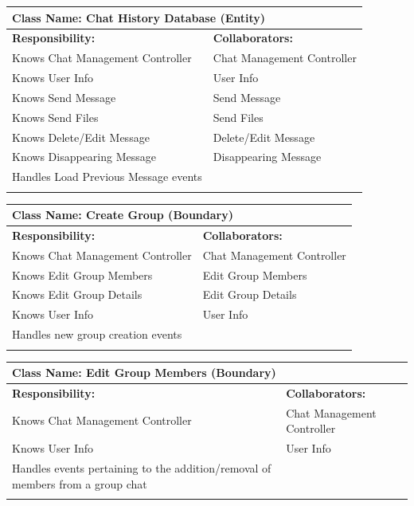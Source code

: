 \documentclass[]{article}
\begin{document}
\begin{itemize}
	\begin{table}[ht]
		\centering
		\begin{tabular}{|p{7cm}|p{7cm}|}
		\hline 
		\multicolumn{2}{|l|}{\textbf{Class Name:} Chat History Database (Entity)} \\
		\hline
		\textbf{Responsibility:} & \textbf{Collaborators:} \\
		\hline
  			Knows Chat Management Controller & Chat Management Controller \\
     			Knows User Info & User Info \\
			Knows Send Message & Send Message \\
			Knows Send Files & Send Files \\
			Knows Delete/Edit Message & Delete/Edit Message\\
			Knows Disappearing Message & Disappearing Message \\
			Handles Load Previous Message events & \\
		\vspace{1in} & \\
		\hline
		\end{tabular}
	\end{table}

  	\begin{table}[ht]
		\centering
		\begin{tabular}{|p{7cm}|p{7cm}|}
		\hline 
		\multicolumn{2}{|l|}{\textbf{Class Name:} Create Group (Boundary)} \\
		\hline
		\textbf{Responsibility:} & \textbf{Collaborators:} \\
		\hline
  			Knows Chat Management Controller & Chat Management Controller \\
			Knows Edit Group Members & Edit Group Members \\
			Knows Edit Group Details & Edit Group Details \\
			Knows User Info & User Info \\
			Handles new group creation events &\\
		\vspace{1in} & \\
		\hline
		\end{tabular}
	\end{table}

   	\begin{table}[ht]
		\centering
		\begin{tabular}{|p{7cm}|p{7cm}|}
		\hline 
		\multicolumn{2}{|l|}{\textbf{Class Name:} Edit Group Members (Boundary)} \\
		\hline
		\textbf{Responsibility:} & \textbf{Collaborators:} \\
		\hline
  			Knows Chat Management Controller & Chat Management Controller \\
			Knows User Info & User Info \\
			Handles events pertaining to the addition/removal of members from a group chat &\\
		\vspace{1in} & \\
		\hline
		\end{tabular}
	\end{table}


\end{itemize}
\end{document}
